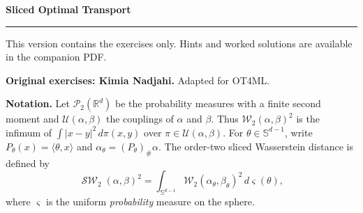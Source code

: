\documentclass[11pt,a4paper]{article}
\theoremstyle{exostyle}
\newif\ifcorr
\newcommand{\R}{\mathbb{R}}
\newcommand{\push}{\#}
\newcommand{\Wtwo}{\mathcal{W}_2}
\newcommand{\ip}[2]{\langle #1,#2\rangle}
\renewcommand{\maketitle}{\thispagestyle{plain}\begingroup
  \color{heading}\LARGE\bfseries\SheetTitle\par\endgroup
  \vspace{3pt}{\large\ifcorr Statements, hints and worked solutions\else Exercise statements\fi}\par
  \vspace{7pt}\hrule\vspace{9pt}
  \ifcorr Each exercise is followed by question-by-question hints and a worked solution.
  Try the questions before reading the hints.\else
  This version contains the exercises only. Hints and worked solutions are available in the companion PDF.\fi
  \par\medskip}
\newcommand{\SheetTitle}{Sliced Optimal Transport}
\DeclareMathOperator{\SW}{\mathcal{SW}}
\newcommand{\PPtwo}{\mathcal P_2}
\newcommand{\Couplings}{\mathcal U}
\newcommand{\Sphere}{\mathbb S}
\begin{document}
\maketitle
\textbf{Original exercises: Kimia Nadjahi.} Adapted for OT4ML.

\textbf{Notation.}
Let $\PPtwo(\R^d)$ be the probability measures with a finite second moment
and $\Couplings(\alpha,\beta)$ the couplings of $\alpha$ and $\beta$.
Thus $\Wtwo(\alpha,\beta)^2$ is the infimum of
$\int |x-y|^2\,d\pi(x,y)$ over $\pi\in\Couplings(\alpha,\beta)$.
For $\theta\in\Sphere^{d-1}$, write
$P_\theta(x)=\ip{\theta}{x}$ and $\alpha_\theta=(P_\theta)_\push\alpha$.
The order-two sliced Wasserstein distance is defined by
\[
  \SW_2(\alpha,\beta)^2
    =\int_{\Sphere^{d-1}}\Wtwo(\alpha_\theta,\beta_\theta)^2
      \,d\varsigma(\theta),
\]
where $\varsigma$ is the uniform \emph{probability} measure on the sphere.
\end{document}
